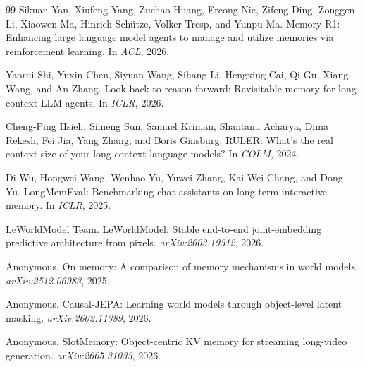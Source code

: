\begin{thebibliography}{99}
Sikuan Yan, Xiufeng Yang, Zuchao Huang, Ercong Nie, Zifeng Ding, Zonggen Li,
Xiaowen Ma, Hinrich Sch{\"u}tze, Volker Tresp, and Yunpu Ma.
\newblock Memory-R1: Enhancing large language model agents to manage and
utilize memories via reinforcement learning.
\newblock In \emph{ACL}, 2026.

Yaorui Shi, Yuxin Chen, Siyuan Wang, Sihang Li, Hengxing Cai, Qi Gu, Xiang
Wang, and An Zhang.
\newblock Look back to reason forward: Revisitable memory for long-context LLM
agents.
\newblock In \emph{ICLR}, 2026.

Cheng-Ping Hsieh, Simeng Sun, Samuel Kriman, Shantanu Acharya, Dima Rekesh,
Fei Jia, Yang Zhang, and Boris Ginsburg.
\newblock RULER: What's the real context size of your long-context language
models?
\newblock In \emph{COLM}, 2024.

Di Wu, Hongwei Wang, Wenhao Yu, Yuwei Zhang, Kai-Wei Chang, and Dong Yu.
\newblock LongMemEval: Benchmarking chat assistants on long-term interactive
memory.
\newblock In \emph{ICLR}, 2025.

LeWorldModel Team.
\newblock LeWorldModel: Stable end-to-end joint-embedding predictive
architecture from pixels.
\newblock \emph{arXiv:2603.19312}, 2026.

Anonymous.
\newblock On memory: A comparison of memory mechanisms in world models.
\newblock \emph{arXiv:2512.06983}, 2025.

Anonymous.
\newblock Causal-JEPA: Learning world models through object-level latent
masking.
\newblock \emph{arXiv:2602.11389}, 2026.

Anonymous.
\newblock SlotMemory: Object-centric KV memory for streaming long-video
generation.
\newblock \emph{arXiv:2605.31033}, 2026.

\end{thebibliography}
